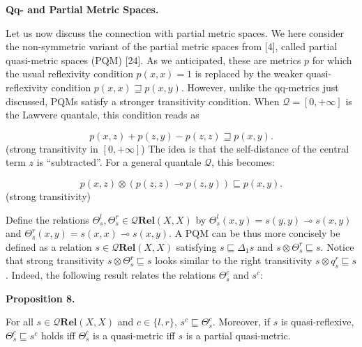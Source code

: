 \documentclass[10pt,a4paper]{amsart}
\begin{document}
 
 
 
\par\medskip\noindent\textbf{Qq- and Partial Metric Spaces.}\par
 
 
Let us now discuss the connection with partial metric spaces. We here consider the non-symmetric variant of the partial metric spaces from [4], called partial quasi-metric spaces (PQM) [24]. As we anticipated, these are metrics $p$ for which the usual reflexivity condition $p(x,x)=1$ is replaced by the weaker quasi-reflexivity condition $p(x,x)\sqsupseteq p(x,y)$. However, unlike the qq-metrics just discussed, PQMs satisfy a stronger transitivity condition. When $\mathcal{Q}=[0,+\infty]$ is the Lawvere quantale, this condition reads as\par
    \[p(x,z)+p(z,y)-p(z,z)\sqsupseteq p(x,y).\]  (strong transitivity in $[0,+\infty]$)   
The idea is that the self-distance of the central term $z$ is “subtracted”. For a general quantale $\mathcal{Q}$, this becomes:\par
    \[p(x,z)\otimes(p(z,z)\multimap p(z,y))\sqsubseteq p(x,y).\]  (strong transitivity)   
 
 
Define the relations $\Theta^{l}_{s},\Theta^{r}_{s}\in\mathcal{Q}\mathbf{Rel}(X,X)$ by $\Theta^{l}_{s}(x,y)=s(y,y)\multimap s(x,y)$ and $\Theta^{r}_{s}(x,y)=s(x,x)\multimap s(x,y)$. A PQM can be thus more concisely be defined as a relation $s\in\mathcal{Q}\mathbf{Rel}(X,X)$ satisfying $s\sqsubseteq\Delta_{1}s$ and $s\otimes\Theta^{r}_{s}\sqsubseteq s$. Notice that strong transitivity $s\otimes\Theta^{r}_{s}\sqsubseteq s$ looks similar to the right transitivity $s\otimes q^{r}_{s}\sqsubseteq s$. Indeed, the following result relates the relations $\Theta^{c}_{s}$ and $s^{c}$:\par
 
 
 
\par\medskip\noindent\textbf{Proposition 8.}\par
 
 
For all $s\in\mathcal{Q}\mathbf{Rel}(X,X)$ and $c\in\{l,r\}$, $s^{c}\sqsubseteq\Theta^{c}_{s}$. Moreover, if $s$ is quasi-reflexive, $\Theta^{c}_{s}\sqsubseteq s^{c}$ holds iff $\Theta^{c}_{s}$ is a quasi-metric iff $s$ is a partial quasi-metric.\par
 
\end{document}

